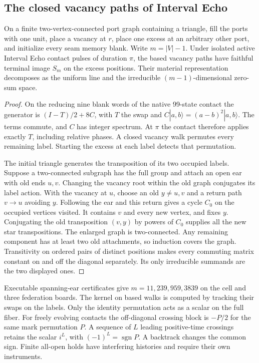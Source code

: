 \documentclass[11pt]{article}
\begin{document}
\subsection{The closed vacancy paths of Interval Echo}
\label{sec:vacancy-material-holonomy}

\begin{proposition}
On a finite two-vertex-connected port graph containing a triangle, fill the
ports with one unit, place a vacancy at \(r\), place one excess at an
arbitrary other port, and initialize every seam memory blank. Write
\(m=|V|-1\). Under isolated active Interval Echo contact pulses of duration
\(\pi\), the based vacancy paths have faithful terminal image \(S_m\)
on the excess positions. Their material representation decomposes as the
uniform line and the irreducible \((m-1)\)-dimensional zero-sum space.
\end{proposition}

\begin{proof}
On the reducing nine blank words of the native 99-state contact the
generator is \((I-T)/2+8C\), with \(T\) the swap and
\(C|a,b\rangle=(a-b)^2|a,b\rangle\). The terms commute, and \(C\) has
integer spectrum. At \(\pi\) the contact therefore applies exactly \(T\),
including relative phases. A closed vacancy walk permutes every remaining
label. Starting the excess at each label detects that permutation.

The initial triangle generates the transposition of its two occupied
labels. Suppose a two-connected subgraph has the full group and attach an
open ear with old ends \(u,v\). Changing the vacancy root within the old
graph conjugates its label action. With the vacancy at \(u\), choose an old
\(y\ne u,v\) and a return path \(v\to u\) avoiding \(y\). Following the ear
and this return gives a cycle \(C_0\) on the occupied vertices visited. It
contains \(v\) and every new vertex, and fixes \(y\). Conjugating the old
transposition \((v,y)\) by powers of \(C_0\) supplies all the new star
transpositions. The enlarged graph is two-connected. Any remaining
component has at least two old attachments, so induction covers the graph.
Transitivity on ordered pairs of distinct positions makes every commuting
matrix constant on and off the diagonal separately. Its only irreducible
summands are the two displayed ones.
\end{proof}

Executable spanning-ear certificates give \(m=11,239,959,3839\) on the cell
and three federation boards. The kernel on based walks is computed by
tracking their swaps on the labels. Only the identity permutation acts as a
scalar on the full fiber. For freely evolving contacts the off-diagonal
crossing block is \(-P/2\) for the same mark permutation \(P\). A sequence of
\(L\) leading positive-time crossings retains the scalar \(i^L\), with
\((-1)^L=\operatorname{sgn}P\). A backtrack changes the common sign. Finite
all-open holds have interfering histories and require their own instruments.
\end{document}
